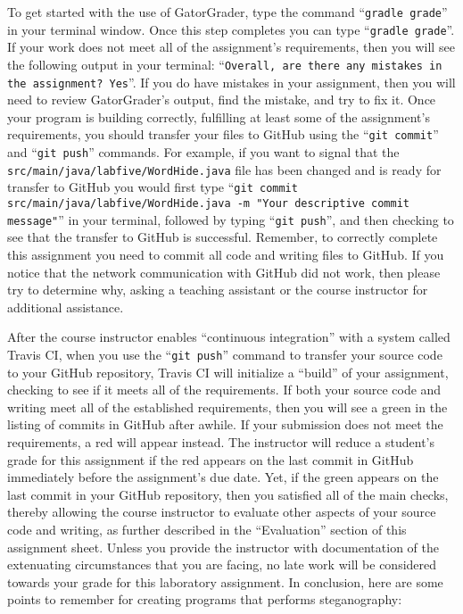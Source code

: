 \documentclass[11pt]{article}
\newcommand{\mainprogramsource}{\lstinline{src/main/java/labfive/WordHide.java}}
\newcommand{\gatorgraderstart}{\command{gradle grade}}
\newcommand{\gatorgradercheck}{\command{gradle grade}}
\newcommand{\gitcommit}{\command{git commit}}
\newcommand{\gitpush}{\command{git push}}
\newcommand{\gitcommitmainprogram}{\command{git commit src/main/java/labfive/WordHide.java -m "Your
descriptive commit message"}}
\newcommand{\command}[1]{``\lstinline{#1}''}
\newcommand{\step}[1]{``{#1}''}
\newcommand{\checkmark}{\ding{51}}
\newcommand{\naughtmark}{\ding{55}}
\begin{document}
To get started with the use of GatorGrader, type the command \gatorgraderstart{}
in your terminal window. Once this step completes you can type
\gatorgradercheck{}. If your work does not meet all of the assignment's
requirements, then you will see the following output in your terminal:
\command{Overall, are there any mistakes in the assignment? Yes}. If you do have
mistakes in your assignment, then you will need to review GatorGrader's output,
find the mistake, and try to fix it. Once your program is building correctly,
fulfilling at least some of the assignment's requirements, you should transfer
your files to GitHub using the \gitcommit{} and \gitpush{} commands. For
example, if you want to signal that the \mainprogramsource{} file has been
changed and is ready for transfer to GitHub you would first type
\gitcommitmainprogram{} in your terminal, followed by typing \gitpush{}, and
then checking to see that the transfer to GitHub is successful. Remember, to
correctly complete this assignment you need to commit all code and writing files
to GitHub. If you notice that the network communication with GitHub did not
work, then please try to determine why, asking a teaching assistant or the
course instructor for additional assistance.

After the course instructor enables \step{continuous integration} with a system
called Travis CI, when you use the \gitpush{} command to transfer your source
code to your GitHub repository, Travis CI will initialize a \step{build} of your
assignment, checking to see if it meets all of the requirements. If both your
source code and writing meet all of the established requirements, then you will
see a green \checkmark{} in the listing of commits in GitHub after awhile. If
your submission does not meet the requirements, a red \naughtmark{} will appear
instead. The instructor will reduce a student's grade for this assignment if the
red \naughtmark{} appears on the last commit in GitHub immediately before the
assignment's due date. Yet, if the green \checkmark{} appears on the last commit
in your GitHub repository, then you satisfied all of the main checks, thereby
allowing the course instructor to evaluate other aspects of your source code and
writing, as further described in the \step{Evaluation} section of this
assignment sheet. Unless you provide the instructor with documentation of the
extenuating circumstances that you are facing, no late work will be considered
towards your grade for this laboratory assignment. In conclusion, here are some
points to remember for creating programs that performs steganography:
\end{document}
